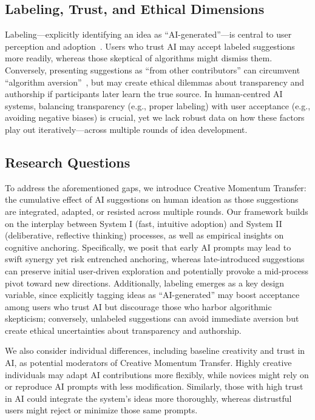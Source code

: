\documentclass{article}
\begin{document}
\subsection{Labeling, Trust, and Ethical Dimensions}
Labeling—explicitly identifying an idea as “AI-generated”—is central to user perception and adoption~\cite{dietvorst2015algorithm,bankins2024multilevel}. Users who trust AI may accept labeled suggestions more readily, whereas those skeptical of algorithms might dismiss them. Conversely, presenting suggestions as “from other contributors” can circumvent “algorithm aversion”~\cite{dietvorst2015overcoming}, but may create ethical dilemmas about transparency and authorship if participants later learn the true source. In human-centred AI systems, balancing transparency (e.g., proper labeling) with user acceptance (e.g., avoiding negative biases) is crucial, yet we lack robust data on how these factors play out iteratively—across multiple rounds of idea development.

\subsection{Research Questions}
To address the aforementioned gaps, we introduce Creative Momentum Transfer: the cumulative effect of AI suggestions on human ideation as those suggestions are integrated, adapted, or resisted across multiple rounds. Our framework builds on the interplay between System I (fast, intuitive adoption) and System II (deliberative, reflective thinking) processes, as well as empirical insights on cognitive anchoring. Specifically, we posit that early AI prompts may lead to swift synergy yet risk entrenched anchoring, whereas late-introduced suggestions can preserve initial user-driven exploration and potentially provoke a mid-process pivot toward new directions. Additionally, labeling emerges as a key design variable, since explicitly tagging ideas as “AI-generated” may boost acceptance among users who trust AI but discourage those who harbor algorithmic skepticism; conversely, unlabeled suggestions can avoid immediate aversion but create ethical uncertainties about transparency and authorship.

We also consider individual differences, including baseline creativity and trust in AI, as potential moderators of Creative Momentum Transfer. Highly creative individuals may adapt AI contributions more flexibly, while novices might rely on or reproduce AI prompts with less modification. Similarly, those with high trust in AI could integrate the system’s ideas more thoroughly, whereas distrustful users might reject or minimize those same prompts.
\end{document}
